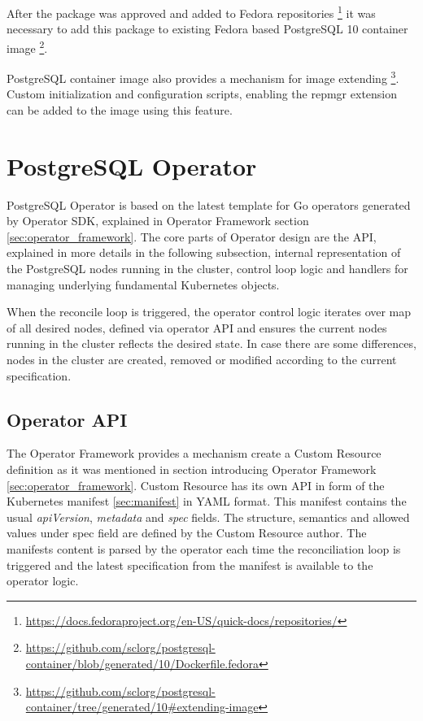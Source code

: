 \documentclass[
  digital, %
  twoside, %
  table,   %
  lof,     %
  lot,     %
]{fithesis3}
\begin{document}
After the package was approved and added to Fedora repositories \footnote{\url{https://docs.fedoraproject.org/en-US/quick-docs/repositories/}} it was necessary to add this package to existing Fedora based PostgreSQL 10 container image \footnote{\url{https://github.com/sclorg/postgresql-container/blob/generated/10/Dockerfile.fedora}}.

PostgreSQL container image also provides a mechanism for image extending \footnote{\url{https://github.com/sclorg/postgresql-container/tree/generated/10\#extending-image}}. Custom initialization and configuration scripts, enabling the repmgr extension can be added to the image using this feature. 

\section{PostgreSQL Operator}
PostgreSQL Operator is based on the latest template for Go operators generated by Operator SDK, explained in Operator Framework section \ref{sec:operator_framework}. The core parts of Operator design are the API, explained in more details in the following subsection, internal representation of the PostgreSQL nodes running in the cluster, control loop logic and handlers for managing underlying fundamental Kubernetes objects.

When the reconcile loop is triggered, the operator control logic iterates over map of all desired nodes, defined via operator API and ensures the current nodes running in the cluster reflects the desired state. In case there are some differences, nodes in the cluster are created, removed or modified according to the current specification.

\subsection{Operator API} \label{sec:operator_api}
The Operator Framework provides a mechanism create a Custom Resource definition as it was mentioned in section introducing Operator Framework \ref{sec:operator_framework}. Custom Resource has its own API in form of the Kubernetes manifest \ref{sec:manifest} in YAML format. This manifest contains the usual \textit{apiVersion}, \textit{metadata} and \textit{spec} fields. The structure, semantics and allowed values under spec field are defined by the Custom Resource author. The manifests content is parsed by the operator each time the reconciliation loop is triggered and the latest specification from the manifest is available to the operator logic.
\end{document}

